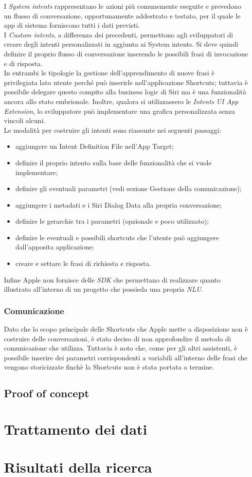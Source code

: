 		I \textit{System intents} rappresentano le azioni più comunemente eseguite e prevedono un flusso di conversazione, opportunamente addestrato e testato, per il quale le app di sistema forniscono tutti i dati previsti. \\
		I \textit{Custom intents}, a differenza dei precedenti, permettono agli sviluppatori di creare degli intenti personalizzati in aggiunta ai System intents. Si deve quindi definire il proprio flusso di conversazione inserendo le possibili frasi di invocazione e di risposta. \\
		In entrambi le tipologie la gestione dell’apprendimento di nuove frasi è privilegiata lato utente perché può inserirle nell'applicazione Shortcuts; tuttavia è possibile delegare questo compito alla business logic di Siri ma è una funzionalità ancora allo stato embrionale. Inoltre, qualora si utilizzassero le \textit{Intents UI App Extension}, lo sviluppatore può implementare una grafica personalizzata senza vincoli alcuni. \\
		Le modalità per costruire gli intenti sono riassunte nei seguenti passaggi:
		\begin{itemize}
			\item aggiungere un Intent Definition File nell’App Target;
			\item definire il proprio intento sulla base delle funzionalità che si vuole implementare;
			\item definire gli eventuali parametri (vedi sezione Gestione della comunicazione);
			\item aggiungere i metadati e i Siri Dialog Data alla propria conversazione;
			\item definire le gerarchie tra i parametri (opzionale e poco utilizzato);
			\item definire le eventuali e possibili shortcuts che l’utente può aggiungere dall'apposita applicazione;
			\item creare e settare le frasi di richiesta e risposta.
		\end{itemize}
		Infine Apple non fornisce delle \textit{SDK} che permettano di realizzare quanto illustrato all'interno di un progetto che possieda una propria \textit{NLU}.
		\subsubsection{Comunicazione}
		Dato che lo scopo principale delle Shortcuts che Apple mette a disposizione non è costruire delle conversazioni, è stato deciso di non approfondire il metodo di comunicazione che utilizza. Tuttavia è noto che, come per gli altri assistenti, è possibile inserire dei parametri corrispondenti a variabili all'interno delle frasi che vengono storicizzate finchè la Shortcuts non è stata portata a termine.
	\subsection{Proof of concept}

\section{Trattamento dei dati}

\section{Risultati della ricerca}